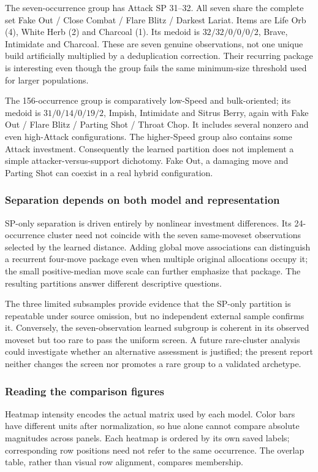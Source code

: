 \documentclass[10pt,a4paper]{article}
\begin{document}
The seven-occurrence group has Attack SP 31--32. All seven share the complete set Fake Out / Close Combat / Flare Blitz / Darkest Lariat. Items are Life Orb (4), White Herb (2) and Charcoal (1). Its medoid is $32/32/0/0/0/2$, Brave, Intimidate and Charcoal. These are seven genuine observations, not one unique build artificially multiplied by a deduplication correction. Their recurring package is interesting even though the group fails the same minimum-size threshold used for larger populations.

The 156-occurrence group is comparatively low-Speed and bulk-oriented; its medoid is $31/0/14/0/19/2$, Impish, Intimidate and Sitrus Berry, again with Fake Out / Flare Blitz / Parting Shot / Throat Chop. It includes several nonzero and even high-Attack configurations. The higher-Speed group also contains some Attack investment. Consequently the learned partition does not implement a simple attacker-versus-support dichotomy. Fake Out, a damaging move and Parting Shot can coexist in a real hybrid configuration.

\subsubsection{Separation depends on both model and representation}
SP-only separation is driven entirely by nonlinear investment differences. Its 24-occurrence cluster need not coincide with the seven same-moveset observations selected by the learned distance. Adding global move associations can distinguish a recurrent four-move package even when multiple original allocations occupy it; the small positive-median move scale can further emphasize that package. The resulting partitions answer different descriptive questions.

The three limited subsamples provide evidence that the SP-only partition is repeatable under source omission, but no independent external sample confirms it. Conversely, the seven-observation learned subgroup is coherent in its observed moveset but too rare to pass the uniform screen. A future rare-cluster analysis could investigate whether an alternative assessment is justified; the present report neither changes the screen nor promotes a rare group to a validated archetype.

\subsubsection{Reading the comparison figures}
Heatmap intensity encodes the actual matrix used by each model. Color bars have different units after normalization, so hue alone cannot compare absolute magnitudes across panels. Each heatmap is ordered by its own saved labels; corresponding row positions need not refer to the same occurrence. The overlap table, rather than visual row alignment, compares membership.
\end{document}
